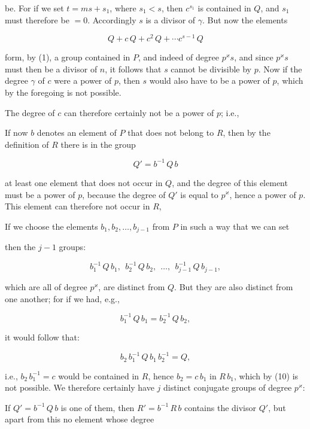 
be. For if we set $t = m s + s_1$, where $s_1 < s$, then $c^{s_1}$
is contained in $Q$, and $s_1$ must therefore be $= 0$. Accordingly $s$ is a
divisor of $\gamma$. But now the elements

\[
Q + c\,Q + c^2\,Q + \cdots c^{s-1}\,Q
\]

form, by (1), a group contained in $P$, and indeed of degree $p^{\varkappa} s$,
and since $p^{\varkappa} s$ must then be a divisor of $n$, it follows that $s$
cannot be divisible by $p$. Now if the degree $\gamma$ of $c$
were a power of $p$, then $s$ would also have to be a power of $p$, which
by the foregoing is not possible.

The degree of $c$ can therefore certainly not be a power of
$p$; i.e., 

If now $b$ denotes an element of $P$ that does not belong to $R$,
then by the definition of $R$ there is in the group

\[
Q' = b^{-1}\,Q\,b
\]

at least one element that does not occur in $Q$, and the
degree of this element must be a power of $p$, because the
degree of $Q'$ is equal to $p^{\varkappa}$, hence a power of $p$. This element
can therefore not occur in $R$, 

If we choose the elements $b_1, b_2, \ldots, b_{j-1}$ from $P$ in such a way
that we can set


then the $j - 1$ groups:

\[
b_1^{-1}\,Q\,b_1,\ \ b_2^{-1}\,Q\,b_2,\ \ \ldots,\ \ b_{j-1}^{-1}\,Q\,b_{j-1},
\]

which are all of degree $p^{\varkappa}$, are distinct from $Q$. But they are
also distinct from one another; for if we had, e.g.,

\[
b_1^{-1}\,Q\,b_1 = b_2^{-1}\,Q\,b_2,
\]

it would follow that:

\[
b_2\,b_1^{-1}\,Q\,b_1\,b_2^{-1} = Q,
\]

i.e., $b_2\,b_1^{-1} = c$ would be contained in $R$, hence $b_2 = c\,b_1$ in $R\,b_1$, which
by (10) is not possible. We therefore certainly have $j$ distinct
conjugate groups of degree $p^{\varkappa}$:


If $Q' = b^{-1}\,Q\,b$ is one of them, then $R' = b^{-1}\,R\,b$ contains
the divisor $Q'$, but apart from this no element whose degree
